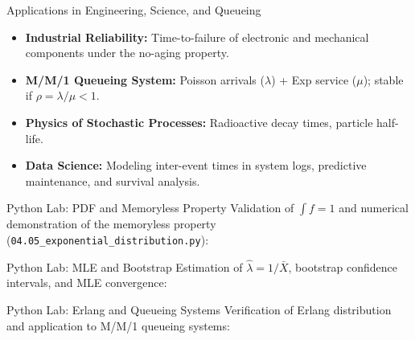\documentclass[aspectratio=169,xcolor={dvipsnames,table}]{beamer}
\begin{document}
\begin{frame}{Applications in Engineering, Science, and Queueing}
	\vspace{-0.1cm}
	\begin{itemize}\itemsep=0.1cm
		\item \textbf{Industrial Reliability:} Time-to-failure of electronic and mechanical components under the no-aging property. \pause
		\item \textbf{M/M/1 Queueing System:} Poisson arrivals ($\lambda$) + Exp service ($\mu$); stable if $\rho = \lambda/\mu < 1$. \pause
		\item \textbf{Physics of Stochastic Processes:} Radioactive decay times, particle half-life. \pause
		\item \textbf{Data Science:} Modeling inter-event times in system logs, predictive maintenance, and survival analysis.
	\end{itemize}
\end{frame}

\begin{frame}[fragile]{Python Lab: PDF and Memoryless Property}
	\vspace{-0.05cm}
	\scriptsize
	Validation of $\int f = 1$ and numerical demonstration of the memoryless property (\texttt{04.05\_exponential\_distribution.py}):
	\vspace{0.02cm}
	{
	}
\end{frame}

\begin{frame}[fragile]{Python Lab: MLE and Bootstrap}
	\vspace{-0.05cm}
	\scriptsize
	Estimation of $\hat{\lambda} = 1/\bar{X}$, bootstrap confidence intervals, and MLE convergence:
	\vspace{0.02cm}
	{
	}
\end{frame}

\begin{frame}[fragile]{Python Lab: Erlang and Queueing Systems}
	\vspace{-0.05cm}
	\scriptsize
	Verification of Erlang distribution and application to M/M/1 queueing systems:
	\vspace{0.02cm}
	{
	}
\end{frame}
\end{document}
